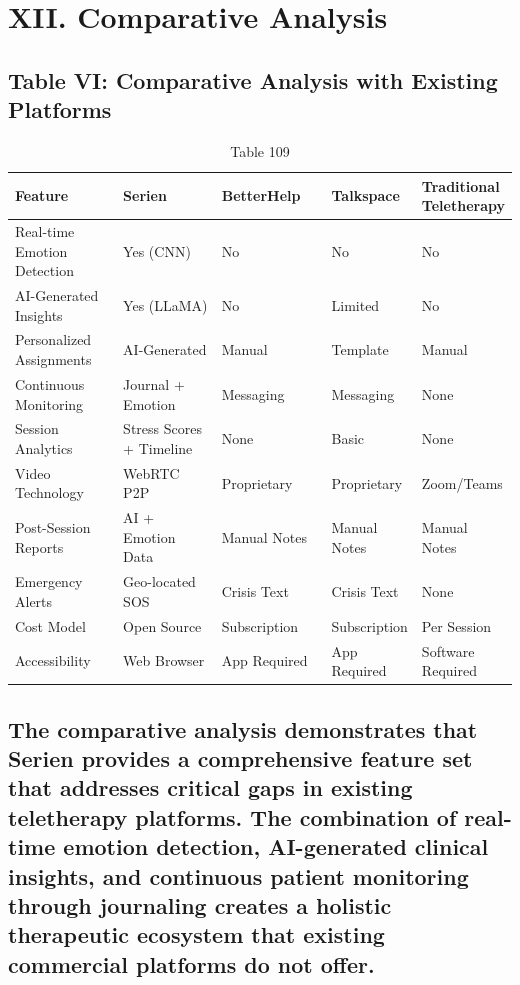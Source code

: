 \documentclass[conference]{IEEEtran}
\begin{document}
\section{XII. Comparative Analysis}
\subsection{Table VI: Comparative Analysis with Existing Platforms}
\begin{table}[t]
\centering
\caption{Table 109}
\begin{tabular}{|p{0.3\linewidth}|p{0.3\linewidth}|p{0.3\linewidth}|p{0.3\linewidth}|p{0.3\linewidth}|}
\hline
Feature & Serien & BetterHelp & Talkspace & Traditional Teletherapy \\
\hline
Real-time Emotion Detection & Yes (CNN) & No & No & No \\
\hline
AI-Generated Insights & Yes (LLaMA) & No & Limited & No \\
\hline
Personalized Assignments & AI-Generated & Manual & Template & Manual \\
\hline
Continuous Monitoring & Journal + Emotion & Messaging & Messaging & None \\
\hline
Session Analytics & Stress Scores + Timeline & None & Basic & None \\
\hline
Video Technology & WebRTC P2P & Proprietary & Proprietary & Zoom/Teams \\
\hline
Post-Session Reports & AI + Emotion Data & Manual Notes & Manual Notes & Manual Notes \\
\hline
Emergency Alerts & Geo-located SOS & Crisis Text & Crisis Text & None \\
\hline
Cost Model & Open Source & Subscription & Subscription & Per Session \\
\hline
Accessibility & Web Browser & App Required & App Required & Software Required \\
\hline
\end{tabular}
\end{table}
\subsection{The comparative analysis demonstrates that Serien provides a comprehensive feature set that addresses critical gaps in existing teletherapy platforms. The combination of real-time emotion detection, AI-generated clinical insights, and continuous patient monitoring through journaling creates a holistic therapeutic ecosystem that existing commercial platforms do not offer.}
\end{document}
